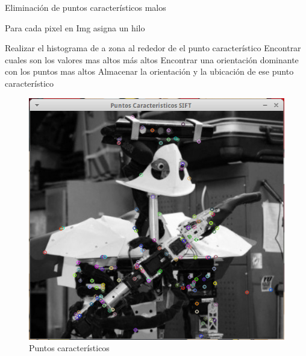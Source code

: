 \pagebreak

\begin{algorithm}[H]
\caption{Eliminación de puntos característicos malos}
 Para cada pixel en Img asigna un hilo\;
 
 {
	{
		Realizar el histograma de a zona al rededor de el punto característico\;
		Encontrar cuales son los valores mas altos más altos\;
		Encontrar una orientación dominante con los puntos mas altos\;
		Almacenar la orientación y la ubicación de ese punto característico\; 
				
	}
}
	
\end{algorithm}




\begin{figure}[h]
			\centering
				\includegraphics[scale=1]{img/KeyPoints.png}
			\caption{Puntos característicos }
\end{figure}



























